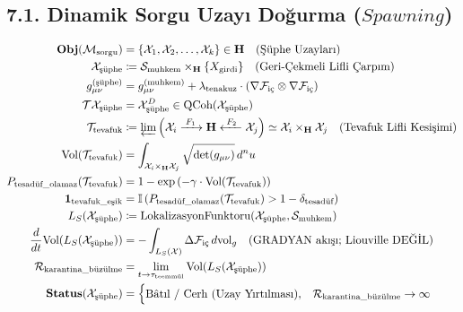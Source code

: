 \documentclass[11pt, a4paper]{article}
\begin{document}
\subsection{7.1. Dinamik Sorgu Uzayı Doğurma ($Spawning$)}
\begin{align}
\mathbf{Obj}(\mathcal{M}_{\text{sorgu}}) &= \{ \mathcal{X}_1, \mathcal{X}_2, \dots, \mathcal{X}_k \} \in \mathbf{H} \quad (\text{Şüphe Uzayları}) \\
\mathcal{X}_{\text{şüphe}} &\coloneqq \mathcal{S}_{\text{muhkem}} \times_{\mathbf{H}} \{ X_{\text{girdi}} \} \quad (\text{Geri-Çekmeli Lifli Çarpım}) \\
g_{\mu\nu}^{(\text{şüphe})} &= g_{\mu\nu}^{(\text{muhkem})} + \lambda_{\text{tenakuz}} \cdot \left( \nabla \mathcal{F}_{\text{iç}} \otimes \nabla \mathcal{F}_{\text{iç}} \right) \\
\mathcal{T}\mathcal{X}_{\text{şüphe}} &= \mathcal{X}_{\text{şüphe}}^D \in \text{QCoh}(\mathcal{X}_{\text{şüphe}}) \\
\mathcal{T}_{\text{tevafuk}} &\coloneqq \varprojlim \left( \mathcal{X}_i \xrightarrow{\;F_1\;} \mathbf{H} \xleftarrow{\;F_2\;} \mathcal{X}_j \right) \simeq \mathcal{X}_i \times_{\mathbf{H}} \mathcal{X}_j \quad (\text{Tevafuk Lifli Kesişimi}) \\
\text{Vol}(\mathcal{T}_{\text{tevafuk}}) &= \int_{\mathcal{X}_i \times_{\mathbf{H}} \mathcal{X}_j} \sqrt{\det(g_{\mu\nu})} \, d^n u \\
P_{\text{tesadüf\_olamaz}}(\mathcal{T}_{\text{tevafuk}}) &= 1 - \exp\left( -\gamma \cdot \text{Vol}(\mathcal{T}_{\text{tevafuk}}) \right) \\
\mathbf{1}_{\text{tevafuk\_eşik}} &= \mathbb{I}\left( P_{\text{tesadüf\_olamaz}}(\mathcal{T}_{\text{tevafuk}}) > 1 - \delta_{\text{tesadüf}} \right) \\
L_S(\mathcal{X}_{\text{şüphe}}) &\coloneqq \text{LokalizasyonFunktoru}(\mathcal{X}_{\text{şüphe}}, \mathcal{S}_{\text{muhkem}}) \\
\frac{d}{dt} \text{Vol}(L_S(\mathcal{X}_{\text{şüphe}})) &= -\int_{L_S(\mathcal{X})} \Delta \mathcal{F}_{\text{iç}} \, d\text{vol}_g \quad (\text{GRADYAN akışı; Liouville DEĞİL}) \\
\mathcal{R}_{\text{karantina\_büzülme}} &= \lim_{t \to \tau_{\text{teemmül}}} \text{Vol}(L_S(\mathcal{X}_{\text{şüphe}})) \\
\mathbf{Status}(\mathcal{X}_{\text{şüphe}}) &= 
\begin{cases}
\text{Bâtıl / Cerh (Uzay Yırtılması)}, & \mathcal{R}_{\text{karantina\_büzülme}} \to \infty \\

\end{cases}
\end{align}
\end{document}
